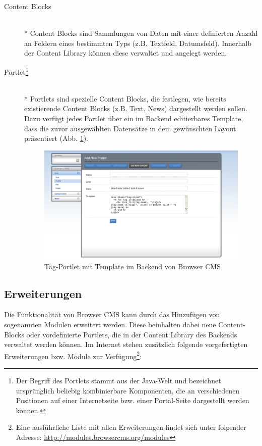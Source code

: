 \begin{description}
\item[Content Blocks]\mbox{~}\\*
Content Blocks sind Sammlungen von Daten mit einer definierten Anzahl an Feldern eines bestimmten Typs (z.B. Textfeld, Datumsfeld). Innerhalb der Content Library können diese verwaltet und angelegt werden.
\item[Portlet\footnote{Der Begriff des Portlets stammt aus der Java-Welt und bezeichnet ursprünglich beliebig kombinierbare Komponenten, die an verschiedenen Positionen auf einer Internetseite bzw. einer Portal-Seite dargestellt werden können.}]\mbox{~}\\*
Portlets sind spezielle Content Blocks, die festlegen, wie bereits existierende Content Blocks (z.B. Text, News) dargestellt werden sollen. Dazu verfügt jedes Portlet über ein im Backend editierbares Template, dass die zuvor ausgewählten Datensätze in dem gewünschten Layout präsentiert (Abb. \ref{browsertagportlet}).

\begin{figure}[!h]
\begin{center}
\includegraphics[scale=0.3]{images/analyse/browser/tagportlet.png}
\caption{Tag-Portlet mit Template im Backend von Browser CMS}
\label{browsertagportlet}
\end{center}
\end{figure}


\end{description}

\subsection{Erweiterungen}
Die Funktionalität von Browser CMS kann durch das Hinzufügen von sogenannten Modulen erweitert werden. Diese beinhalten dabei neue Content-Blocks oder vordefinierte Portlets, die in der Content Library des Backends verwaltet werden können. Im Internet stehen zusätzlich folgende vorgefertigten Erweiterungen bzw. Module zur Verfügung\footnote{Eine ausführliche Liste mit allen Erweiterungen findet sich unter folgender Adresse: \href{http://modules.browsercms.org/modules}{http://modules.browsercms.org/modules}}:



